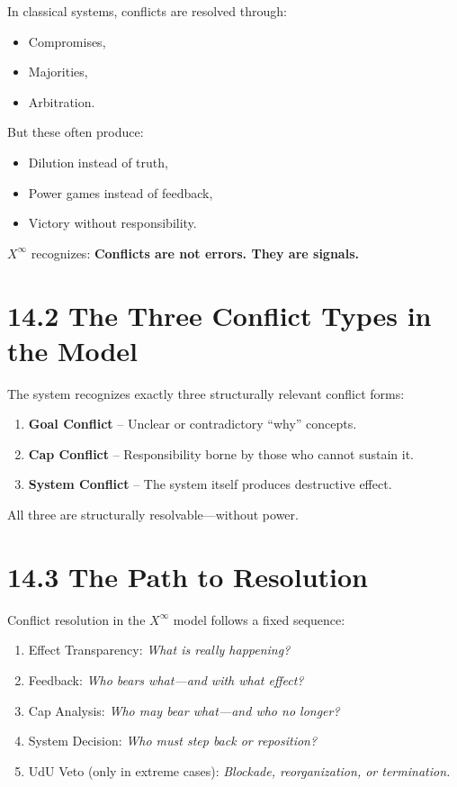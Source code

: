 \documentclass[12pt,a4paper]{book}
\begin{document}
In classical systems, conflicts are resolved through:

\begin{itemize}
    \item Compromises,
    \item Majorities,
    \item Arbitration.
\end{itemize}

But these often produce:

\begin{itemize}
    \item Dilution instead of truth,
    \item Power games instead of feedback,
    \item Victory without responsibility.
\end{itemize}

$X^\infty$ recognizes:  
\textbf{Conflicts are not errors. They are signals.}

\section*{14.2 The Three Conflict Types in the Model}

The system recognizes exactly three structurally relevant conflict forms:

\begin{enumerate}
    \item \textbf{Goal Conflict} – Unclear or contradictory “why” concepts.
    \item \textbf{Cap Conflict} – Responsibility borne by those who cannot sustain it.
    \item \textbf{System Conflict} – The system itself produces destructive effect.
\end{enumerate}

All three are structurally resolvable—without power.

\section*{14.3 The Path to Resolution}

Conflict resolution in the $X^\infty$ model follows a fixed sequence:

\begin{enumerate}
    \item Effect Transparency: \textit{What is really happening?}
    \item Feedback: \textit{Who bears what—and with what effect?}
    \item Cap Analysis: \textit{Who may bear what—and who no longer?}
    \item System Decision: \textit{Who must step back or reposition?}
    \item UdU Veto (only in extreme cases): \textit{Blockade, reorganization, or termination.}
\end{enumerate}
\end{document}
